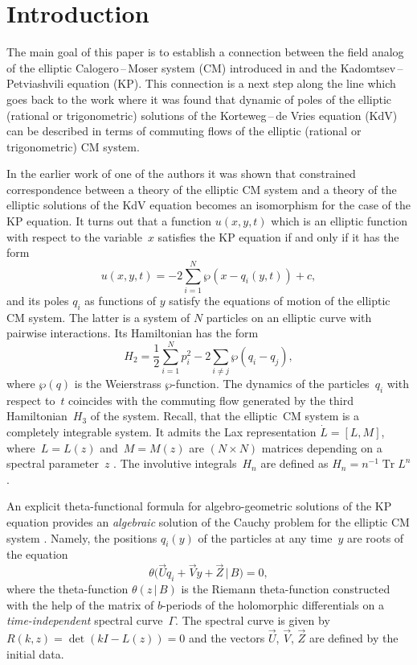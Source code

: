\documentclass[a4paper,11pt]{article}
\newcommand{\vU}{\Vec{U}}
\newcommand{\vV}{\Vec{V}}
\newcommand{\vZ}{\Vec{Z}}
\DeclareMathOperator{\Tr}{Tr}
\theoremstyle{plain}
\theoremstyle{remark}
\begin{document}
\section{Introduction}

The main goal of this paper is to establish a connection between
the field analog of the elliptic Calogero\,--\,Moser system (CM)
introduced in \cite{krvb} and the Kadomtsev\,--\,Petviashvili
equation (KP).
This connection is a next step along the line which goes back to the
work \cite{amkm} where it was found that dynamic of poles of the
elliptic (rational or trigonometric) solutions of the Korteweg\,--\,de
Vries equation (KdV) can be described in terms of commuting flows of
the elliptic (rational or trigonometric) CM system.

In the earlier work of one of the authors \cite{krelkp} it was shown that
constrained correspondence between a theory of the elliptic CM system
and a theory of the elliptic solutions of the KdV equation becomes an
isomorphism for the case of the KP equation. It turns out that a
function $u(x,y,t)$ which is an elliptic function with respect to the
variable~$x$ satisfies the KP equation if and only if it has the form
\begin{equation}\label{pot}
u(x,y,t)=-2\sum_{i=1}^N\wp(x-q_i(y,t))+c,
\end{equation}
and its poles $q_i$ as functions of $y$ satisfy the equations of
motion of the elliptic CM system. The latter is a system of $N$ particles
on an elliptic curve with pairwise interactions. Its Hamiltonian has the
form
$$
H_2=\frac{1}{2}\sum_{i=1}^N p_i^2 - 2 \sum_{i\ne j}\wp(q_i-q_j),
$$
where $\wp(q)$ is the Weierstrass $\wp$-function. The dynamics of
the particles~$q_i$ with respect to~$t$ coincides with
the commuting flow generated by the third Hamiltonian~$H_3$ of the system.
Recall, that the elliptic~CM system is a completely integrable system.
It admits the Lax representation $\dot L=[L,M]$, where~$L=L(z)$ and~$M=M(z)$
are $(N\times N)$ matrices depending on a spectral parameter~$z$ \cite{c}.
The involutive integrals~$H_n$ are defined as $H_n=n^{-1}\Tr L^n$.

An explicit theta-functional formula for algebro-geometric solutions
of the KP equation provides an \emph{algebraic} solution
of the Cauchy problem for the elliptic CM system \cite{krelkp}.
Namely, the positions $q_i(y)$ of the particles at any time~$y$ are roots of
the equation
$$
\theta \bigl(\vU q_i+\vV y+\vZ\,|\,B)=0 ,
$$
where the theta-function $\theta(z\,|\,B)$ is the Riemann theta-function
constructed with the help of the matrix of $b$-periods of the holomorphic
differentials on a \emph{time-independent} spectral curve~$\Gamma$.
The spectral curve is given by $R(k,z)=\det (kI-L(z))=0$
and the vectors $\vU$, $\vV$, $\vZ$ are defined by the initial data.
\end{document}
